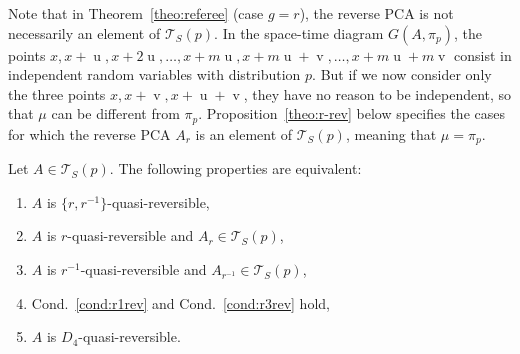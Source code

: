 \documentclass[AHL,Unicode,longabstracts]{cedram}
\newcounter{a}
\newcommand{\Cond}{Cond.}
\newcommand{\triang}[2]{\mathcal{T}_{#1} \left(#2 \right)}
\DeclareMathOperator{\vu}{u}
\DeclareMathOperator{\vv}{v}
\begin{document}
Note that in Theorem~\ref{theo:referee} (case $g=r$), the reverse PCA is not necessarily an element of $\triang{S}{p}$. In the space-time diagram $G(A,\pi_p)$, the points $x,x+\vu,x+2\vu,\ldots,x+m\vu,x+m\vu+\vv,\ldots,x+m\vu+m\vv$ consist in independent random variables with distribution $p$. But if we now consider only the three points $x,x+\vv,x+\vu+\vv$, they have no reason to be independent, so that $\mu$ can be different from $\pi_p$. Proposition~\ref{theo:r-rev} below specifies the cases for which the reverse PCA $A_r$ is an element of $\triang{S}{p}$, meaning that $\mu=\pi_p$.

\begin{prop}\label{theo:r-rev}
Let $A \in \triang{S}{p}$. The following properties are equivalent:
\begin{enumerate}
\item \label{list4.4.1}$A$ is $\{r,r^{-1}\}$-quasi-reversible,
\item \label{list4.4.2}$A$ is $r$-quasi-reversible and $A_r \in \triang{S}{p}$,
\item \label{list4.4.3}$A$ is $r^{-1}$-quasi-reversible and $A_{r^{-1}} \in \triang{S}{p}$,
\item \label{list4.4.4}\Cond~\ref{cond:r1rev} and \Cond~\ref{cond:r3rev} hold,
\item \label{list4.4.5}$A$ is $D_4$-quasi-reversible.
\end{enumerate}
\end{prop}
\end{document}
